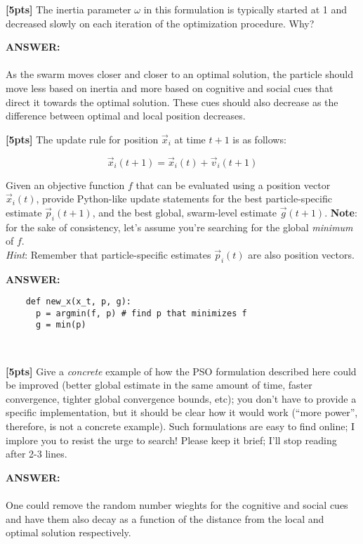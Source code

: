 \documentclass[paper=a4, fontsize=11pt]{scrartcl} %
\numberwithin{figure}{section} %
\numberwithin{table}{section} %
\begin{document}
\textbf{[5pts]} The inertia parameter $\omega$ in this formulation is typically started at 1 and decreased slowly on each iteration of the optimization procedure. Why? \\
\begin{addmargin}[2em]{2em}%
  \textbf{ANSWER:}\\\\
  As the swarm moves closer and closer to an optimal solution, the particle should move less based on inertia and more based on cognitive and social cues that direct it towards the optimal solution. These cues should also decrease as the difference between optimal and local position decreases.
  \\
\end{addmargin}
\textbf{[5pts]} The update rule for position $\vec{x}_i$ at time $t + 1$ is as follows:

$$
\vec{x}_i(t + 1) = \vec{x}_i(t) + \vec{v}_i(t + 1)
$$

Given an objective function $f$ that can be evaluated using a position vector $\vec{x}_i(t)$, provide Python-like update statements for the best particle-specific estimate $\vec{p}_i(t + 1)$, and the best global, swarm-level estimate $\vec{g}(t + 1)$. \textbf{Note}: for the sake of consistency, let's assume you're searching for the global \emph{minimum} of $f$. \\

\emph{Hint}: Remember that particle-specific estimates $\vec{p}_i(t)$ are also position vectors. \\
\begin{addmargin}[2em]{2em}%
  \textbf{ANSWER:}
  \begin{verbatim}
    def new_x(x_t, p, g):
      p = argmin(f, p) # find p that minimizes f
      g = min(p)
  \end{verbatim}
  \\
\end{addmargin}
\textbf{[5pts]} Give a \emph{concrete} example of how the PSO formulation described here could be improved (better global estimate in the same amount of time, faster convergence, tighter global convergence bounds, etc); you don't have to provide a specific implementation, but it should be clear how it would work (``more power'', therefore, is not a concrete example). Such formulations are easy to find online; I implore you to resist the urge to search! Please keep it brief; I'll stop reading after 2-3 lines.
\begin{addmargin}[2em]{2em}%
  \textbf{ANSWER:}\\\\
  One could remove the random number wieghts for the cognitive and social cues and have them also decay as a function of the distance from the local and optimal solution respectively.
  \\

\end{addmargin}
\end{document}
